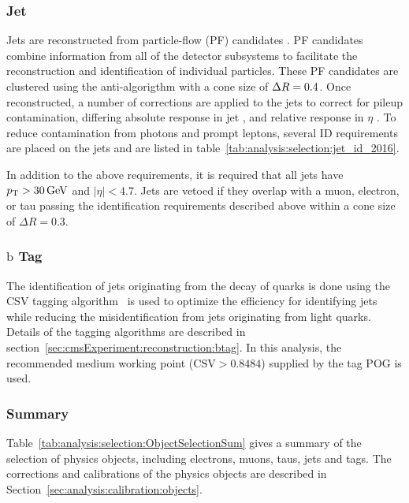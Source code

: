 \subsubsection{Jet}
Jets are reconstructed from particle-flow (PF) candidates \cite{ref:pf}. PF candidates combine information from all of the detector subsystems to facilitate the reconstruction and identification of individual particles.  These PF candidates are clustered using the anti-\kt algorigthm \cite{Cacciari:2008gp} with a cone size of $\Delta R = 0.4$. Once reconstructed, a number of corrections are applied to the jets to correct for pileup contamination, differing absolute response in jet \pt, and relative response in $\eta$ \cite{ref:jetscale}.  To reduce contamination from photons and prompt leptons, several ID requirements are placed on the jets and are listed in table~\ref{tab:analysis:selection:jet_id_2016}.



\noindent In addition to the above requirements, it is required that all jets have $p_{\mathrm{T}} > 30\,\text{Ge\hspace{-.08em}V}$ and $|\eta| < 4.7$.  Jets are vetoed if they overlap with a muon, electron, or tau passing the identification requirements described above within a cone size of $\Delta R = 0.3$. 

\subsubsection{$\mathrm{b}$ Tag} The identification of jets originating from the decay of \PQb quarks is done using the CSV \PQb tagging algorithm~\cite{Sirunyan:2298594} is used to optimize the efficiency for identifying \PQb jets while reducing the misidentification from jets originating from light quarks. Details of the \PQb tagging algorithms are described in section~\ref{sec:cmsExperiment:reconstruction:btag}.  In this analysis, the recommended medium working point ($\text{CSV} > 0.8484$) supplied by the \PQb tag POG is used. 




\subsubsection{Summary}

Table~\ref{tab:analysis:selection:ObjectSelectionSum} gives a summary of the selection of physics objects, including electrons, muons, taus, jets and \PQb tags. The corrections and calibrations of the physics objects are described in Section~\ref{sec:analysis:calibration:objects}.




